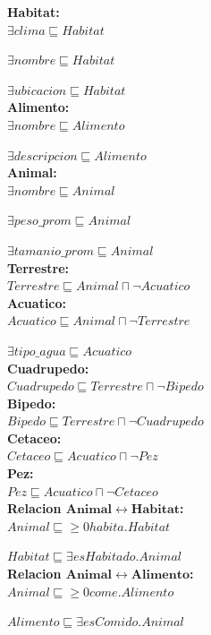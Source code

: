 \begin{tcolorbox}[title=Definicion con Lógicas Descriptivas]
\textbf{Habitat:}\\
$\exists clima \sqsubseteq Habitat$

$\exists nombre \sqsubseteq Habitat$

$\exists ubicacion \sqsubseteq Habitat$\\

\textbf{Alimento:}\\
$\exists nombre \sqsubseteq Alimento$

$\exists descripcion \sqsubseteq Alimento$\\

\textbf{Animal:}\\
$\exists nombre \sqsubseteq Animal$

$\exists peso\_prom \sqsubseteq Animal$

$\exists tamanio\_prom \sqsubseteq Animal$\\

\textbf{Terrestre:}\\
$Terrestre \sqsubseteq Animal \sqcap \lnot Acuatico$\\

\textbf{Acuatico:}\\
$Acuatico \sqsubseteq Animal \sqcap \lnot Terrestre$

$\exists tipo\_agua \sqsubseteq Acuatico$\\

\textbf{Cuadrupedo:}\\
$Cuadrupedo \sqsubseteq Terrestre \sqcap \lnot Bipedo$\\

\textbf{Bipedo:}\\
$Bipedo \sqsubseteq Terrestre \sqcap \lnot Cuadrupedo$\\

\textbf{Cetaceo:}\\
$Cetaceo \sqsubseteq Acuatico \sqcap \lnot Pez$\\

\textbf{Pez:}\\
$Pez \sqsubseteq Acuatico \sqcap \lnot Cetaceo$\\

\textbf{Relacion $\mathbf{Animal \leftrightarrow Habitat}$:}\\
$Animal \sqsubseteq \geq0 habita.Habitat$

$Habitat\sqsubseteq \exists esHabitado.Animal$\\

\textbf{Relacion $\mathbf{Animal \leftrightarrow Alimento}$:}\\
$Animal \sqsubseteq \geq0 come.Alimento$

$Alimento\sqsubseteq \exists esComido.Animal$
\end{tcolorbox}

